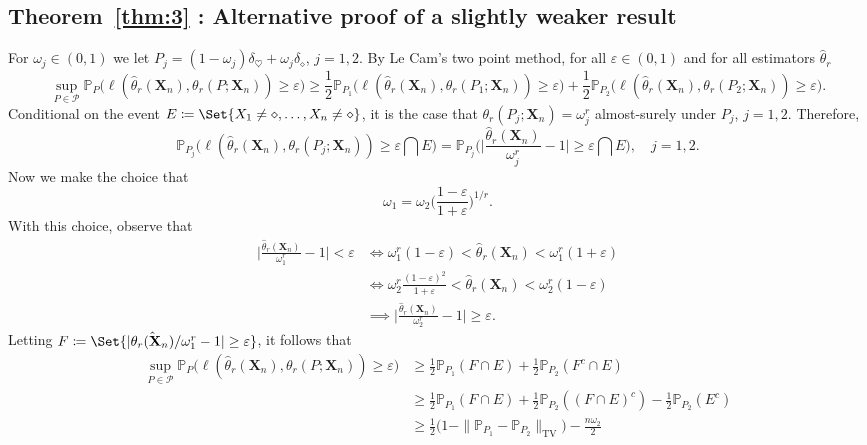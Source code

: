 \documentclass{article}
\newcommand{\1}{\boldsymbol{1}}
\newcommand{\PP}{\mathbb{P}}
\theoremstyle{plain}
\begin{document}
\subsection{Theorem~\ref{thm:3} : Alternative proof of a slightly weaker result}
\label{sec:proof-theor-refthm:3:alternative}

For $\omega_j \in (0,1)$ we let $P_j = (1-\omega_j)\delta_{\heartsuit} + \omega_j\delta_{\diamond}$, $j=1,2$. By Le Cam's two point method, for all $\varepsilon \in (0,1)$ and for all estimators $\hat{\theta}_r$%
\begin{equation*}
  \sup_{P\in \mathcal{P}}\PP_P\Big(%
  \ell(\hat{\theta}_r(\mathbf{X}_n),\theta_r(P;\mathbf{X}_n)) \geq \varepsilon
  \Big)%
  \geq
    \frac{1}{2}\PP_{P_1}\Big(%
  \ell(\hat{\theta}_r(\mathbf{X}_n),\theta_r(P_1;\mathbf{X}_n)) \geq \varepsilon
    \Big)%
    + \frac{1}{2}\PP_{P_2}\Big(%
  \ell(\hat{\theta}_r(\mathbf{X}_n),\theta_r(P_2;\mathbf{X}_n)) \geq \varepsilon
  \Big).
\end{equation*}
Conditional on the event $E \coloneqq \Set{X_1 \ne \diamond,\dots,X_n\ne \diamond}$, it is the case that $\theta_r(P_j;\mathbf{X}_n) = \omega_j^r$ almost-surely under $P_j$, $j=1,2$. Therefore,
\begin{equation*}
  \PP_{P_j}\Big(%
  \ell(\hat{\theta}_r(\mathbf{X}_n),\theta_r(P_j;\mathbf{X}_n)) \geq \varepsilon%
  \bigcap E
  \Big)%
  = \PP_{P_j}\Big(%
  \Big|\frac{\hat{\theta}_r(\mathbf{X}_n)}{\omega_j^r} - 1 \Big| \geq \varepsilon
   \bigcap E\Big),\quad j=1,2.
\end{equation*}
Now we make the choice that
\begin{equation*}
  \omega_1 = \omega_2\Big(\frac{1-\varepsilon}{1 + \varepsilon} \Big)^{1/r}.
\end{equation*}
With this choice, observe that
\begin{align*}
  \Big|\frac{\hat{\theta}_r(\mathbf{X}_n)}{\omega_1^r} - 1 \Big|%
  < \varepsilon%
  &\iff \omega_1^r(1- \varepsilon) < \hat{\theta}_r(\mathbf{X}_n) < \omega_1^r(1+\varepsilon)\\
  &\iff \omega_2^r\frac{(1-\varepsilon)^2}{1+\varepsilon}< \hat{\theta}_r(\mathbf{X}_n) < \omega_2^r(1-\varepsilon)\\
  &\implies \Big|\frac{\hat{\theta}_r(\mathbf{X}_n)}{\omega_2^r} - 1\Big|%
    \geq \varepsilon.
\end{align*}
Letting $F \coloneqq \Set{ |\hat{\theta_r(\mathbf{X}_n)}/\omega_1^r - 1| \geq \varepsilon }$, it follows that
\begin{align*}
   \sup_{P\in \mathcal{P}}\PP_P\Big(%
  \ell(\hat{\theta}_r(\mathbf{X}_n),\theta_r(P;\mathbf{X}_n)) \geq \varepsilon
  \Big)%
  &\geq \frac{1}{2}\PP_{P_1}(F \cap E)%
    + \frac{1}{2}\PP_{P_2}(F^c \cap E)\\
  &\geq \frac{1}{2}\PP_{P_1}(F \cap E)%
    + \frac{1}{2}\PP_{P_2}( (F \cap E)^c )%
    - \frac{1}{2}\PP_{P_2}(E^c)\\
  &\geq%
    \frac{1}{2}\Big(1 - \|\PP_{P_1} - \PP_{P_2}\|_{\textrm{TV}}\Big)%
    - \frac{n\omega_2}{2}
\end{align*}
\end{document}
